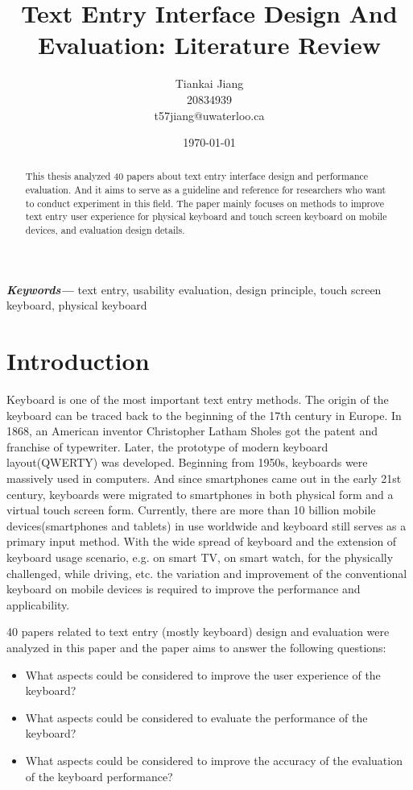 \documentclass[11pt]{article}
\title{Text Entry Interface Design And Evaluation: Literature Review}
\author{Tiankai Jiang\\20834939\\t57jiang@uwaterloo.ca}
\date{\today}
\providecommand{\keywords}[1]
{
  \small    
  \textbf{\textit{Keywords---}} #1
}
\begin{document}
\maketitle

\begin{abstract}
This thesis analyzed 40 papers about text entry interface design and performance evaluation. And it aims to serve as a guideline and reference for researchers who want to conduct experiment in this field. The paper mainly focuses on methods to improve text entry user experience for physical keyboard and touch screen keyboard on mobile devices, and evaluation design details.
\end{abstract}

\keywords{text entry, usability evaluation, design principle, touch screen keyboard, physical keyboard}

\section{Introduction}\label{section-introduction}
Keyboard is one of the most important text entry methods. The origin of the keyboard can be traced back to the beginning of the 17th century in Europe. In 1868, an American inventor Christopher Latham Sholes got the patent and franchise of typewriter. Later, the prototype of modern keyboard layout(QWERTY) was developed. Beginning from 1950s, keyboards were massively used in computers. And since smartphones came out in the early 21st century, keyboards were migrated to smartphones in both physical form and a virtual touch screen form. Currently, there are more than 10 billion mobile devices(smartphones and tablets) in use worldwide and keyboard still serves as a primary input method. With the wide spread of keyboard and the extension of keyboard usage scenario, e.g. on smart TV, on smart watch, for the physically challenged, while driving, etc. the variation and improvement of the conventional keyboard on mobile devices is required to improve the performance and applicability.

40 papers related to text entry (mostly keyboard) design and evaluation were analyzed in this paper and the paper aims to answer the following questions:
\begin{itemize}
    \item What aspects could be considered to improve the user experience of the keyboard?
    \item What aspects could be considered to evaluate the performance of the keyboard?
    \item What aspects could be considered to improve the accuracy of the evaluation of the keyboard performance?
\end{itemize}
\end{document}
